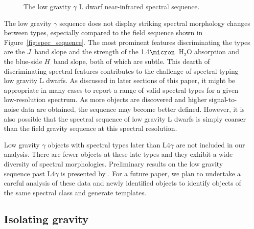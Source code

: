 \documentclass[12pt]{aastex6}
\begin{document}


\begin{figure}
  \caption{The low gravity $\gamma$ L dwarf near-infrared spectral sequence.}
  \label{fig:lg_sequence}
\end{figure}

The low gravity $\gamma$ sequence does not display striking spectral morphology changes between types, especially compared to the field sequence shown in Figure~\ref{fig:spec_sequence}.
The most prominent features discriminating the types are the $J$~band slope and the strength of the 1.4$\micron$~H$_2$O absorption and the blue-side $H$~band slope, both of which are subtle.
This dearth of discriminating spectral features contributes to the challenge of spectral typing low gravity L dwarfs.
As discussed in later sections of this paper, it might be appropriate in many cases to report a range of valid spectral types for a given low-resolution spectrum.
As more objects are discovered and higher signal-to-noise data are obtained, the sequence may become better defined.
However, it is also possible that the spectral sequence of low gravity L dwarfs is simply coarser than the field gravity sequence at this spectral resolution.

Low gravity $\gamma$ objects with spectral types later than L4$\gamma$ are not included in our analysis.
There are fewer objects at these late types and they exhibit a wide diversity of spectral morphologies.
Preliminary results on the low gravity sequence past L4$\gamma$ is presented by \cite{Gagne:2015to}.
For a future paper, we plan to undertake a careful analysis of these data and newly identified objects to identify objects of the same spectral class and generate templates.

\subsection{Isolating gravity}
\end{document}
